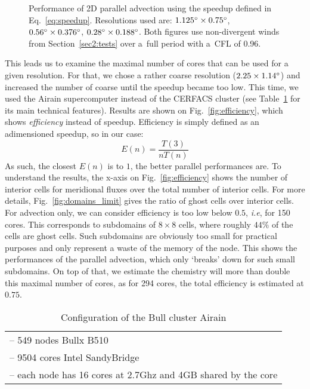 \begin{figure}
  \hfill
  \caption{%
    Performance of 2D parallel advection using the speedup defined in
    Eq.~\eqref{eq:speedup}. Resolutions used are:
    $1.125{^{\circ}}\times0.75^{\circ}$, $0.56{^{\circ}}\times0.376^{\circ}$,
    $0.28{^{\circ}}\times0.188^{\circ}$. Both figures use non-divergent winds from
    Section~\ref{sec2:tests} over a~full period with a~CFL of 0.96.
  }
\end{figure}

This leads us to examine the maximal number of cores that can be used for a
given resolution. For that, we chose a rather coarse resolution
($2.25\times1.14^{\circ}$) and increased the number of coarse until the speedup
became too low. This time, we used the Airain supercomputer instead of the
CERFACS cluster (see Table~\ref{tab:cluster_airain} for its main technical features).
Results are shown on Fig.~\ref{fig:efficiency}, which shows \textit{efficiency}
instead of speedup. Efficiency is simply defined as an adimensioned speedup, so
in our case:
\begin{equation}
  E(n) =\frac{T(3)}{nT(n)}
\end{equation}
As such, the closest $E(n)$ is to $1$, the better parallel performances are.  To
understand the results, the x-axis on Fig.~\ref{fig:efficiency} shows the number
of interior cells for meridional fluxes over the total number of interior cells.
For more details, Fig.~\ref{fig:domains_limit} gives the ratio of ghost cells
over interior cells. For advection only, we can
consider efficiency is too low below $0.5$, \textit{i.e}, for 150 cores.
This corresponds to subdomains of $8\times8$ cells, where roughly
$44\%$ of the cells are ghost cells. Such subdomains are obviously too small
for practical purposes and only represent a waste of the memory of the node.
This shows the performances of the parallel advection, which only `breaks' down
for such small subdomains. On top of that, we estimate the chemistry will more
than double this maximal number of cores, as for 294 cores, the total efficiency
is estimated at $0.75$.

\begin{table}[t]
\caption{Configuration of the Bull cluster Airain}
\centering
\begin{tabular}{l}
\toprule
-- 549 nodes Bullx B510\\
-- 9504 cores Intel SandyBridge\\
-- each node has 16 cores at 2.7Ghz and 4GB shared by the core\\
\bottomrule
\end{tabular}
\label{tab:cluster_airain}
\end{table}

